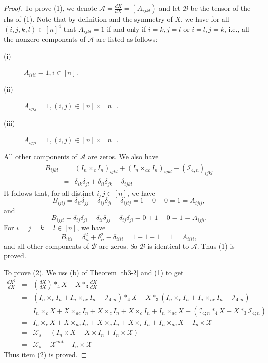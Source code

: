 \documentclass[11pt, oneside]{article}  %
\newcommand{\A}{\mathcal{A}}
\newcommand{\B}{\mathcal{B}}
\newcommand{\caI}{\mathcal{I}}
\newcommand{\X}{\mathcal{X}}
\newcommand{\beyy}{\begin{eqnarray*}}
\newcommand{\eeyy}{\end{eqnarray*}}
\begin{document}
\begin{proof}
To prove (1), we denote $\A=\frac{dX}{dX}=(A_{ijkl})$ and let $\B$ be the tensor of the rhs of (1).  Note that by definition and the symmetry of $X$, we 
have for all $(i,j,k,l)\in [n]^{4}$ that $A_{ijkl}=1$  if and only if  $i=k, j=l$ or $i=l, j=k$, i.e., all the nonzero components of $\A$ are listed as follows:
\begin{description}
\item[(i)]  $A_{iiii} =1, i\in [n]$.
\item[(ii)]  $A_{ijij} =1, (i,j)\in [n]\times [n]$.
\item[(iii)]  $A_{ijji} =1, (i,j)\in [n]\times [n]$.
\end{description}
All other components of $\A$ are zeros.  We also have 
\beyy 
B_{ijkl} 
&=& (I_{n}\times_{c} I_{n})_{ijkl} + (I_{n}\times_{ac} I_{n})_{ijkl} - (\caI_{4,n})_{ijkl}\\
&=& \delta_{ik}\delta_{jl} + \delta_{il}\delta_{jk}  - \delta_{ijkl}
\eeyy
It follows that, for all distinct $i,j\in [n]$, we have   
\[ B_{ijij}=\delta_{ii}\delta_{jj} + \delta_{ij}\delta_{ji}  - \delta_{ijij}=1+0-0 = 1 =A_{ijij}, \]
and 
\[ B_{ijji}=\delta_{ij}\delta_{ji} + \delta_{ii}\delta_{jj}  - \delta_{ij}\delta_{ji} =0+1-0=1=A_{ijji}. \]
For $i=j=k=l \in [n]$, we have 
\[ B_{iiii} = \delta_{ii}^{2} + \delta_{ii}^{2} - \delta_{iiii}=1+1-1 = 1 = A_{iiii},  \]
and all other components of $\B$ are zeros. So $\B$ is identical to $\A$. Thus (1) is proved. \par 
\indent To prove (2). We use (b) of Theorem \ref{th3-2} and (1) to get 
\beyy
\frac{d X^{2}}{dX} 
&=&\left( \frac{d X}{dX}\right)\ast_{4} X + X\ast_{3} \frac{dX}{dX}\\
&=&\left(I_{n}\times_{c} I_{n}+I_{n}\times_{ac} I_{n}-\caI_{4;n}\right)\ast_{4} X + X\ast_{3}\left(I_{n}\times_{c} I_{n}+I_{n}\times_{ac} I_{n}-\caI_{4,n}\right)\\     
&=& I_{n}\times_{c} X +X\times_{ac} I_{n} +X\times_{c} I_{n}+X\times_{c} I_{n} +I_{n}\times_{ac} X-(\caI_{4;n}\ast_{4} X+X\ast_{3}\caI_{4;n})\\
&=& I_{n}\times_{c} X +X\times_{ac} I_{n} +X\times_{c} I_{n}+X\times_{c} I_{n} +I_{n}\times_{ac} X -I_{n}\times \X\\
&=& \X_{s} -( I_{n}\times X+X\times I_{n} + I_{n}\times \X)\\ 
&=& \X_{s} - \X^{nat} -  I_{n}\times \X 
\eeyy  
Thus item (2) is proved. 
\end{proof}
 
\end{document}
